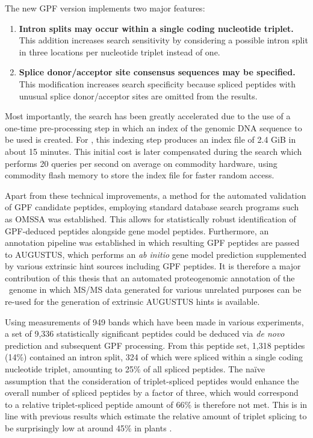 The new GPF version implements two major features:

\begin{enumerate}
\item {\bf Intron splits may occur within a single coding nucleotide triplet.}
This addition increases search sensitivity by considering a possible intron
split in three locations per nucleotide triplet instead of one.

\item {\bf Splice donor/acceptor site consensus sequences may be specified.} 
This modification increases search specificity because spliced peptides with
unusual splice donor/acceptor sites are omitted from the results.
\end{enumerate}

Most importantly, the search has been greatly accelerated due to the use
of a one-time pre-processing step in which an index of the genomic DNA sequence
to be used is created.
For \cre, this indexing step produces an index file of 2.4 GiB in about 15 
minutes.
This initial cost is later compensated during the search which performs
20 queries per second on average on commodity hardware, using commodity flash 
memory to store the index file for faster random access.

Apart from these technical improvements, a method for the automated validation 
of GPF candidate peptides, employing standard database search programs such as 
OMSSA was established.
This allows for statistically robust identification of GPF-deduced peptides
alongside gene model peptides.
Furthermore, an annotation pipeline was established in which resulting GPF
peptides are passed to AUGUSTUS, which performs an {\em ab initio} gene 
model prediction supplemented by various extrinsic hint sources including
GPF peptides.
It is therefore a major contribution of this thesis that an automated
proteogenomic annotation of the \cre~genome in which MS/MS data generated
for various unrelated purposes can be re-used for the generation of
extrinsic AUGUSTUS hints is available.

Using measurements of 949 bands which have been made in various experiments,
a set of 9,336 statistically significant peptides could be deduced via 
{\em de novo} prediction and subsequent GPF processing.
From this peptide set, 1,318 peptides (14\%) contained an intron split,
324 of which were spliced within a single coding nucleotide triplet,
amounting to 25\% of all spliced peptides.
The na\"ive assumption that the consideration of triplet-spliced peptides
would enhance the overall number of spliced peptides by a factor of three,
which would correspond to a relative triplet-spliced peptide amount of 66\%
is therefore not met.
This is in line with previous results which estimate the relative amount
of triplet splicing to be surprisingly low at around 45\% in plants 
\citep{Tomita1996}.

